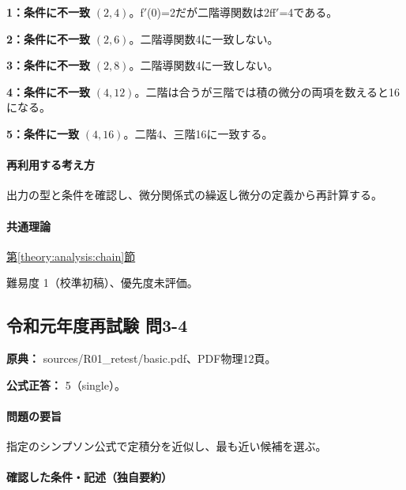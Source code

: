 \noindent\textbf{1：条件に不一致} \((2,4)\)。f\ensuremath{'}(0)=\allowbreak{}2だが二階導関数は2ff\ensuremath{'}=4である。\par

\noindent\textbf{2：条件に不一致} \((2,6)\)。二階導関数4に一致しない。\par

\noindent\textbf{3：条件に不一致} \((2,8)\)。二階導関数4に一致しない。\par

\noindent\textbf{4：条件に不一致} \((4,12)\)。二階は合うが三階では積の微分の両項を数えると16になる。\par

\noindent\textbf{5：条件に一致} \((4,16)\)。二階4、三階16に一致する。\par

\paragraph{再利用する考え方} 出力の型と条件を確認し、微分関係式の繰返し微分の定義から再計算する。

\paragraph{共通理論} \hyperref[theory:analysis:chain]{第\ref*{theory:analysis:chain}節}

\par 難易度 1（校準初稿）、優先度未評価。

\subsection{令和元年度再試験 問3-4}
\label{q:r01-ret-basic-3-4}

\noindent\textbf{原典：} sources/R01\_retest/basic.pdf、PDF物理12頁。

\textbf{公式正答：} 5（single）。

\paragraph{問題の要旨} 指定のシンプソン公式で定積分を近似し、最も近い候補を選ぶ。

\paragraph{確認した条件・記述（独自要約）}\mbox{}\par

